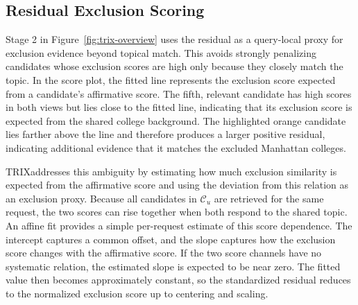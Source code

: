 \documentclass[letterpaper]{article}
\newcommand{\method}{\ifmmode \mathrm{TRIX}\else TRIX\xspace\fi}
\begin{document}
\subsection{Residual Exclusion Scoring}
\label{sec:residual-score}

Stage 2 in Figure~\ref{fig:trix-overview} uses the residual as a query-local
proxy for exclusion evidence beyond topical match.  This avoids strongly
penalizing candidates whose exclusion scores are high only because they closely
match the topic.  In the score plot, the fitted line represents the exclusion
score expected from a candidate's affirmative score.  The fifth, relevant
candidate has high scores in both views but lies close to the fitted line,
indicating that its exclusion score is expected from the shared college
background.  The highlighted orange candidate lies farther above the line and
therefore produces a larger positive residual, indicating additional evidence
that it matches the excluded Manhattan colleges.

\method addresses this ambiguity by estimating how much exclusion similarity
is expected from the affirmative score and using the deviation from this
relation as an exclusion proxy.  Because all candidates in $\mathcal C_u$
are retrieved for the same request, the two scores can rise together when both
respond to the shared topic.  An affine fit provides a simple per-request
estimate of this score dependence.  The intercept captures a common offset, and
the slope captures how the exclusion score changes with the affirmative score.
If the two score channels have no systematic relation, the estimated slope is
expected to be near zero.  The fitted value then becomes approximately
constant, so the standardized residual reduces to the normalized exclusion
score up to centering and scaling.
\end{document}
